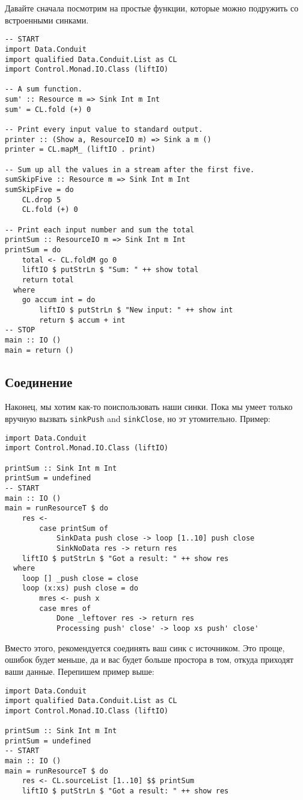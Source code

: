Давайте сначала посмотрим на простые функции, которые можно подружить со встроенными
синками.
\begin{lstlisting}
-- START
import Data.Conduit
import qualified Data.Conduit.List as CL
import Control.Monad.IO.Class (liftIO)

-- A sum function.
sum' :: Resource m => Sink Int m Int
sum' = CL.fold (+) 0

-- Print every input value to standard output.
printer :: (Show a, ResourceIO m) => Sink a m ()
printer = CL.mapM_ (liftIO . print)

-- Sum up all the values in a stream after the first five.
sumSkipFive :: Resource m => Sink Int m Int
sumSkipFive = do
    CL.drop 5
    CL.fold (+) 0

-- Print each input number and sum the total
printSum :: ResourceIO m => Sink Int m Int
printSum = do
    total <- CL.foldM go 0
    liftIO $ putStrLn $ "Sum: " ++ show total
    return total
  where
    go accum int = do
        liftIO $ putStrLn $ "New input: " ++ show int
        return $ accum + int
-- STOP
main :: IO ()
main = return ()
\end{lstlisting}

\subsection{Соединение}

Наконец, мы хотим как-то поиспользовать наши синки. Пока мы умеет только вручную вызвать
\verb*|sinkPush| and \verb*|sinkClose|, но эт утомительно. Пример:
\begin{lstlisting}
import Data.Conduit
import Control.Monad.IO.Class (liftIO)

printSum :: Sink Int m Int
printSum = undefined
-- START
main :: IO ()
main = runResourceT $ do
    res <-
        case printSum of
            SinkData push close -> loop [1..10] push close
            SinkNoData res -> return res
    liftIO $ putStrLn $ "Got a result: " ++ show res
  where
    loop [] _push close = close
    loop (x:xs) push close = do
        mres <- push x
        case mres of
            Done _leftover res -> return res
            Processing push' close' -> loop xs push' close'
\end{lstlisting}
Вместо этого, рекомендуется соединять ваш синк с источником. Это проще, 
ошибок будет меньше, да и вас будет больше простора в том, откуда приходят ваши данные.
Перепишем пример выше:
\begin{lstlisting}
import Data.Conduit
import qualified Data.Conduit.List as CL
import Control.Monad.IO.Class (liftIO)

printSum :: Sink Int m Int
printSum = undefined
-- START
main :: IO ()
main = runResourceT $ do
    res <- CL.sourceList [1..10] $$ printSum
    liftIO $ putStrLn $ "Got a result: " ++ show res
\end{lstlisting}

